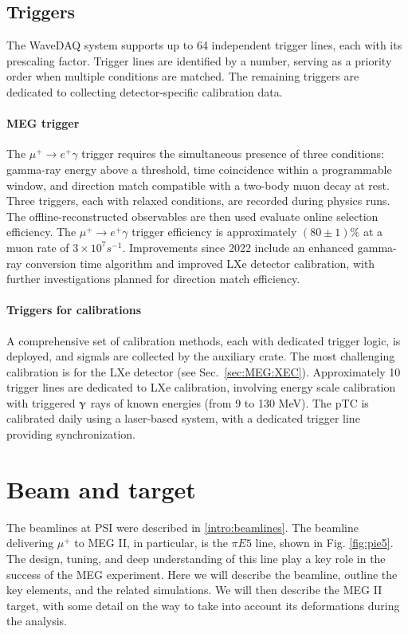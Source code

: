 \begin{refsection}
    \subsection{Triggers}
        The WaveDAQ system supports up to 64 independent trigger lines, each with its prescaling factor. 
        Trigger lines are identified by a number, serving as a priority order when multiple conditions are matched. 
        The remaining triggers are dedicated to collecting detector-specific calibration data.
        
        \paragraph{MEG trigger}
        The $\mu^+ \to e^+ \gamma$ trigger requires the simultaneous presence of three conditions: gamma-ray energy above a threshold, time coincidence within a programmable window, and direction match compatible with a two-body muon decay at rest. 
        Three triggers, each with relaxed conditions, are recorded during physics runs.        
        The offline-reconstructed observables are then used evaluate online selection efficiency. 
        The $\mu^+ \to e^+\gamma$ trigger efficiency is approximately $(80 \pm 1)\%$ at a muon rate of $3 \times 10^7 s^{-1}$. 
        Improvements since 2022 include an enhanced gamma-ray conversion time algorithm and improved LXe detector calibration, with further investigations planned for direction match efficiency.

        \paragraph{Triggers for calibrations}
        A comprehensive set of calibration methods, each with dedicated trigger logic, is deployed, and signals are collected by the auxiliary crate.
        The most challenging calibration is for the LXe detector (see Sec.~\ref{sec:MEG:XEC}). 
        Approximately 10 trigger lines are dedicated to LXe calibration, involving energy scale calibration with triggered $\upgamma$ rays of known energies (from 9 to 130 MeV). 
        The pTC is calibrated daily using a laser-based system, with a dedicated trigger line providing synchronization. 
        
\section{Beam and target}
    The beamlines at PSI were described in \ref{intro:beamlines}. 
    The beamline delivering $\mu^+$ to MEG II, in particular, is the $\pi E5$ line, shown in  Fig. \ref{fig:pie5}.
    The design, tuning, and deep understanding of this line play a key role in the success of the MEG experiment. 
    Here we will describe the beamline, outline the key elements, and the related simulations. 
    We will then describe the MEG II target, with some detail on the way to take into account its deformations during the analysis.


\end{refsection}
